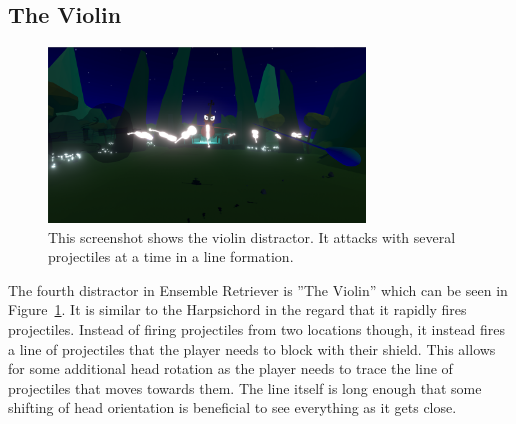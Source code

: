 \subsection{The Violin}
\begin{figure}[tbph]
    \centering
    \includegraphics[width=0.75\textwidth]{figures/screenshots/violin.png}
    \caption[The Violin Distractor]{This screenshot shows the violin distractor. It attacks with several projectiles at a time in a line formation.}
    \label{fig:violinDistractor}
\end{figure}
The fourth distractor in Ensemble Retriever is ''The Violin'' which can be seen in Figure~\ref{fig:violinDistractor}. It is similar to the Harpsichord in the regard that it rapidly fires projectiles. Instead of firing projectiles from two locations though, it instead fires a line of projectiles that the player needs to block with their shield. This allows for some additional head rotation as the player needs to trace the line of projectiles that moves towards them. The line itself is long enough that some shifting of head orientation is beneficial to see everything as it gets close. 

